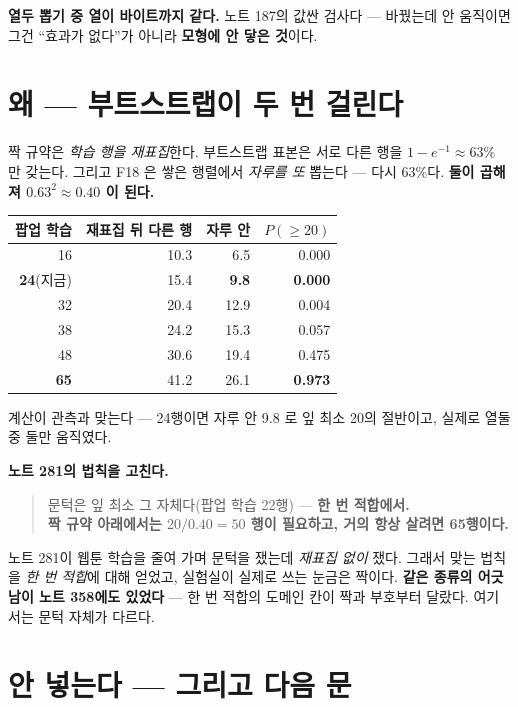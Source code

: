 \documentclass[11pt]{article}
\begin{document}
\textbf{열두 뽑기 중 열이 바이트까지 같다.} 노트 187의 값싼 검사다 ---
바꿨는데 안 움직이면 그건 ``효과가 없다''가 아니라 \textbf{모형에 안
닿은 것}이다.

\section{왜 --- 부트스트랩이 두 번 걸린다}

짝 규약은 \emph{학습 행을 재표집}한다. 부트스트랩 표본은 서로 다른 행을
$1-e^{-1} \approx 63\%$ 만 갖는다. 그리고 F18 은 쌓은 행렬에서 \emph{자루를
또} 뽑는다 --- 다시 63\%다. \textbf{둘이 곱해져 $0.63^2 \approx 0.40$ 이
된다.}

\begin{center}
\begin{tabular}{rrrr}
\hline
팝업 학습 & 재표집 뒤 다른 행 & 자루 안 & $P(\ge 20)$ \\
\hline
16 & 10.3 & 6.5 & 0.000 \\
\textbf{24}(지금) & 15.4 & \textbf{9.8} & \textbf{0.000} \\
32 & 20.4 & 12.9 & 0.004 \\
38 & 24.2 & 15.3 & 0.057 \\
48 & 30.6 & 19.4 & 0.475 \\
\textbf{65} & 41.2 & 26.1 & \textbf{0.973} \\
\hline
\end{tabular}
\end{center}

계산이 관측과 맞는다 --- 24행이면 자루 안 9.8 로 잎 최소 20의 절반이고,
실제로 열둘 중 둘만 움직였다.

\textbf{노트 281의 법칙을 고친다.}
\begin{quote}
문턱은 잎 최소 그 자체다(팝업 학습 22행) --- \textbf{한 번 적합에서.} \\
\textbf{짝 규약 아래에서는 $20/0.40 = 50$ 행이 필요하고, 거의 항상 살려면
65행이다.}
\end{quote}

노트 281이 웹툰 학습을 줄여 가며 문턱을 쟀는데 \emph{재표집 없이} 쟀다.
그래서 맞는 법칙을 \emph{한 번 적합}에 대해 얻었고, 실험실이 실제로 쓰는
눈금은 짝이다. \textbf{같은 종류의 어긋남이 노트 358에도 있었다} --- 한 번
적합의 도메인 칸이 짝과 부호부터 달랐다. 여기서는 문턱 자체가 다르다.

\section{안 넣는다 --- 그리고 다음 문}
\end{document}
